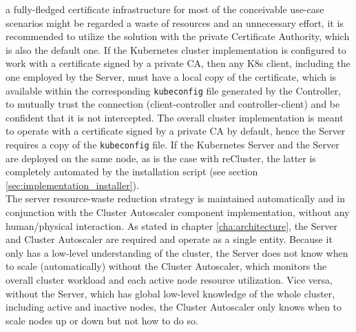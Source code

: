 a fully-fledged certificate infrastructure for most of the conceivable use-case scenarios
might be regarded a waste of resources and an unnecessary effort, it is
recommended to utilize the solution with the private Certificate Authority, which
is also the default one. If the Kubernetes cluster implementation is configured
to work with a certificate signed by a private CA, then any K8s client,
including the one employed by the Server, must have a local copy of the certificate,
which is available within the corresponding \texttt{kubeconfig} file generated by
the Controller, to mutually trust the connection (client-controller and controller-client)
and be confident that it is not intercepted. The overall cluster implementation is
meant to operate with a certificate signed by a private CA by default, hence the
Server requires a copy of the \texttt{kubeconfig} file. If the Kubernetes Server
and the Server are deployed on the same node, as is the case with reCluster, the
latter is completely automated by the installation script (see section \ref{sec:implementation_installer}).
\\ %
The server resource-waste reduction strategy is maintained automatically and in
conjunction with the Cluster Autoscaler component implementation, without any human/physical
interaction. As stated in chapter \ref{cha:architecture}, the Server and Cluster
Autoscaler are required and operate as a single entity. Because it only has a
low-level understanding of the cluster, the Server does not know when to scale (automatically)
without the Cluster Autoscaler, which monitors the overall cluster workload and
each active node resource utilization. Vice versa, without the Server, which has
global low-level knowledge of the whole cluster, including active and inactive
nodes, the Cluster Autoscaler only knows when to scale nodes up or down but not how
to do so.


